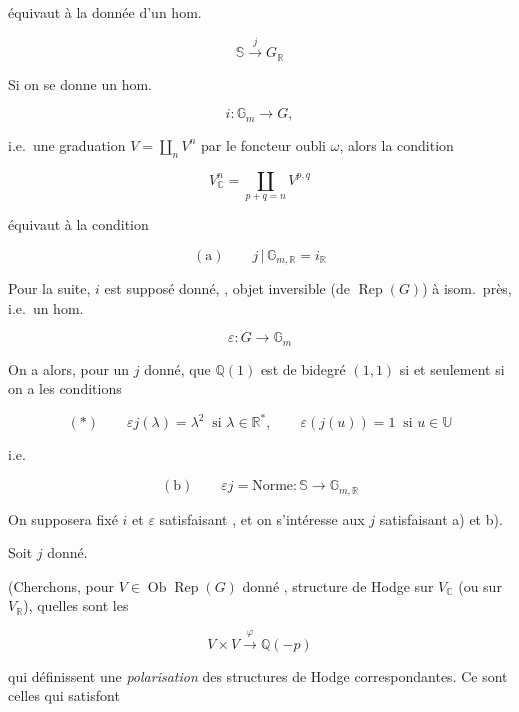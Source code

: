\documentclass[11pt,a4paper]{article}
\begin{document}

équivaut à la donnée d'un hom.

\[ \mathbb{S} \xrightarrow{\ j\ } G_{\mathbb{R}} \]

Si on se donne un hom.\ 

\[ i : \mathbb{G}_{m} \longrightarrow G , \]

i.e.\ une graduation $V = \coprod_{n} V^{n}$ par le foncteur oubli $\omega$,
alors la condition

\[ V^{n}_{\mathbb{C}} = \coprod_{p+q=n} V^{p,q} \]


équivaut à la condition

\[ (\mathrm{a}) \qquad j \,|\, \mathbb{G}_{m,\mathbb{R}} = i_{\mathbb{R}} \]

Pour la suite, $i$ est supposé donné, ,  objet
inversible (de $\operatorname{Rep}(G)$) à isom.\ près, i.e.\ un hom.

\[ \varepsilon : G \longrightarrow \mathbb{G}_{m} \]

On a alors, pour un $j$ donné, que $\mathbb{Q}(1)$ est de bidegré $(1,1)$ si et
seulement si on a les conditions

\[ (*) \qquad \varepsilon j(\lambda) = \lambda^{2} \ \text{ si } \lambda \in \mathbb{R}^{*} , \qquad \varepsilon(j(u)) = 1 \ \text{ si } u \in \mathbb{U} \]

i.e.

\[ (\mathrm{b}) \qquad \varepsilon j = \text{Norme} : \mathbb{S} \longrightarrow \mathbb{G}_{m,\mathbb{R}} \]

On supposera fixé $i$ et $\varepsilon$ satisfaisant \struck{\ill{}}
, et on s'intéresse aux $j$
satisfaisant a) et b).

Soit $j$ donné.

(Cherchons, pour $V \in \operatorname{Ob} \operatorname{Rep}(G)$ donné , \ill{} structure de Hodge sur $V_{\mathbb{C}}$ (ou sur
$V_{\mathbb{R}}$), quelles sont les 

\[ V \times V \xrightarrow{\ \varphi\ } \mathbb{Q}(-p) \]

 qui définissent une \emph{polarisation} des
structures de Hodge correspondantes. Ce sont celles qui satisfont 
\end{document}
